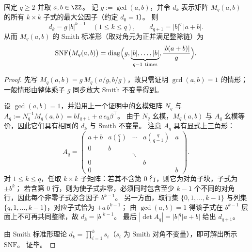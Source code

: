 \begin{conclusion}\label{con:xi-terminal-replica-softcore-mq-ab-smith-snf}
固定 \(q\ge 2\) 并取 \(a,b\in\ZZ\)。
记 \(g:=\gcd(a,b)\)，并令 \(d_k\) 表示矩阵 \(M_q(a,b)\) 的所有 \(k\times k\) 子式的最大公因子（约定 \(d_0=1\)）。
则
\[
d_k=g\,|b|^{k-1}\quad(1\le k\le q),
\qquad
d_{q+1}=|b|^{q}\,|a+b|.
\]
从而 \(M_q(a,b)\) 的 Smith 标准形（取对角元为正并满足整除链）为
\[
\mathrm{SNF}\big(M_q(a,b)\big)
=\mathrm{diag}\Bigl(g,\underbrace{|b|,\dots,|b|}_{q-1\ \mathrm{times}},\frac{|b(a+b)|}{g}\Bigr).
\]
\end{conclusion}
\begin{proof}
先写 \(M_q(a,b)=g\,M_q(a/g,b/g)\)，故只需证明 \(\gcd(a,b)=1\) 的情形；一般情形由整体乘子 \(g\) 同步放大 Smith 不变量得到。
\par
设 \(\gcd(a,b)=1\)，并沿用上一个证明中的幺模矩阵 \(N_q\) 与
\(
A_q:=N_q^{-1}M_q(a,b)=bI_{q+1}+a\,e_0\beta^{\top}
\)。
由于 \(N_q\) 幺模，\(M_q(a,b)\) 与 \(A_q\) 幺模等价，因此它们具有相同的 \(d_k\) 与 Smith 不变量。
注意 \(A_q\) 具有显式上三角形：
\[
A_q=
\begin{pmatrix}
a+b & a\binom{q}{1} & \cdots & a\binom{q}{q-1} & a\\
0& b\\
& & \ddots\\
0&&& b\\
0&&&& b
\end{pmatrix}.
\]
对 \(1\le k\le q\)，任取 \(k\times k\) 子矩阵：若其不含第 \(0\) 行，则它为对角子块，子式为 \(\pm b^{k}\)；
若含第 \(0\) 行，则为使子式非零，必须同时包含至少 \(k-1\) 个不同的对角行，因此每个非零子式必含因子 \(b^{k-1}\)。
另一方面，取行集 \(\{0,1,\dots,k-1\}\) 与列集 \(\{q,1,\dots,k-1\}\)，对应子式恰为 \(\pm a\,b^{k-1}\)；
由 \(\gcd(a,b)=1\) 得该子式在 \(b^{k-1}\) 层面上不可再共同整除，故 \(d_k=|b|^{k-1}\)。
最后 \(|\det A_q|=|b|^{q}|a+b|\) 给出 \(d_{q+1}\)。
\par
由 Smith 标准形理论 \(d_k=\prod_{i=1}^{k}s_i\)（\(s_i\) 为 Smith 对角不变量），即可解出所示 \(\mathrm{SNF}\)。
证毕。
\end{proof}

